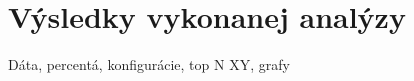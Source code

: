 \chapter{Výsledky vykonanej analýzy}
\label{analysis-and-its-results}

Dáta, percentá, konfigurácie, top N XY, grafy


